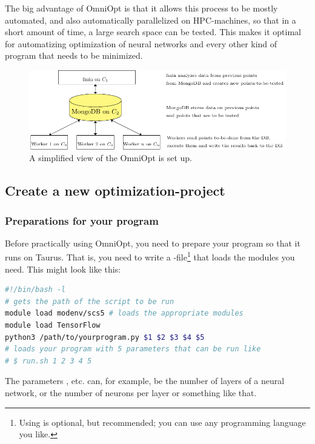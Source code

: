 \documentclass[]{scrartcl}
\begin{document}
The big advantage of OmniOpt is that it allows this process to be mostly automated, and also 
automatically parallelized on HPC-machines, so that in a short amount of time, a large search space
can be tested. This makes it optimal for automatizing optimization of neural networks and every other
kind of program that needs to be minimized.

\begin{figure}[b!]
        \centering
        \includegraphics[width=0.7\paperwidth]{aufbau/aufbau.pdf}
        \caption{A simplified view of the OmniOpt is set up.}
\end{figure}

\subsection{Create a new optimization-project}

\subsubsection{Preparations for your program}

Before practically using OmniOpt, you need to prepare your program so that it runs on Taurus. That is,
you need to write a -file\footnote{Using  is optional, but recommended; 
you can use any programming language you like.} that loads the modules you need. This might look like this:

\begin{lstlisting}[language=bash]
#!/bin/bash -l
# gets the path of the script to be run
module load modenv/scs5 # loads the appropriate modules
module load TensorFlow
python3 /path/to/yourprogram.py $1 $2 $3 $4 $5
# loads your program with 5 parameters that can be run like
# $ run.sh 1 2 3 4 5
\end{lstlisting}

The parameters ,  etc. can, for example, be the number of layers of a neural network,
or the number of neurons per layer or something like that.
\end{document}
